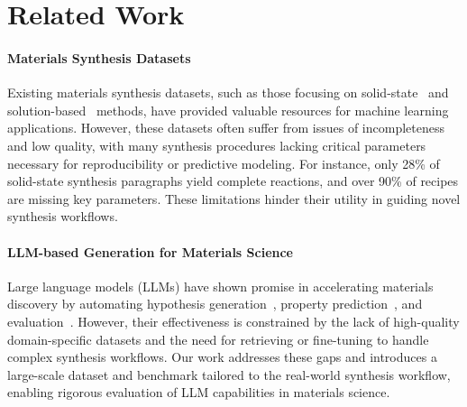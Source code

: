 \section{Related Work}

\paragraph*{Materials Synthesis Datasets}

Existing materials synthesis datasets, such as those focusing on solid-state~\cite{kononova2019text} and solution-based~\cite{wang2022dataset} methods, have provided valuable resources for machine learning applications. However, these datasets often suffer from issues of incompleteness and low quality, with many synthesis procedures lacking critical parameters necessary for reproducibility or predictive modeling. For instance, only 28\% of solid-state synthesis paragraphs yield complete reactions, and over 90\% of recipes are missing key parameters. These limitations hinder their utility in guiding novel synthesis workflows.

\paragraph*{LLM-based Generation for Materials Science}

Large language models (LLMs) have shown promise in accelerating materials discovery by automating hypothesis generation~\cite{kumbhar2025hypothesisgenerationmaterialsdiscovery}, property prediction~\cite{chiang2024llamplargelanguagemodel}, and evaluation~\cite{mishra2024llamat}. However, their effectiveness is constrained by the lack of high-quality domain-specific datasets and the need for retrieving or fine-tuning to handle complex synthesis workflows. Our work addresses these gaps and introduces a large-scale dataset and benchmark tailored to the real-world synthesis workflow, enabling rigorous evaluation of LLM capabilities in materials science.




